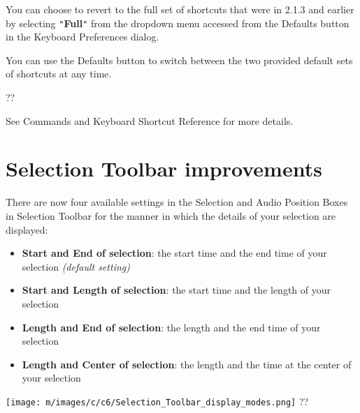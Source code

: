 You can choose to revert to the full set of shortcuts that were in 2.1.3 and earlier by selecting \texttt{{}"{}}\textbf{Full}\texttt{{}"{}} from the dropdown menu accessed from the 
Defaults
 button in the Keyboard Preferences dialog.

You can use the 
Defaults
 button to switch between the two provided default sets of shortcuts at any time.





??

See Commands and Keyboard Shortcut Reference for more details.




\section{
Selection Toolbar improvements
}


There are now four available settings in the Selection and Audio Position Boxes in Selection Toolbar for the  manner in which the details of your selection are displayed:
\begin{itemize}
\item \textbf{Start and End of selection}: the start time and the end time of your selection \textit{(default setting)}
\item \textbf{Start and Length of selection}: the start time and the length of your selection
\item \textbf{Length and End of selection}: the length and the end time of your selection
\item \textbf{Length and Center of selection}: the length and the time at the center of your selection
\end{itemize}

\texttt{[image: m/images/c/c6/Selection\_Toolbar\_display\_modes.png]}
??



